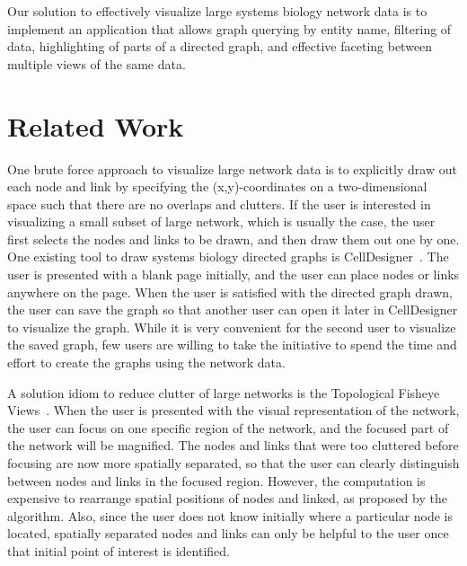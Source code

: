 \documentclass[journal]{vgtc}                %
\begin{document}
Our solution to effectively visualize large systems biology network data is to implement an application that allows graph querying by entity name, filtering of data, highlighting of parts of a directed graph, and effective faceting between multiple views of the same data.





\section{Related Work}
One brute force approach to visualize large network data is to explicitly draw out each node and link by specifying the (x,y)-coordinates on a two-dimensional space such that there are no overlaps and clutters. If the user is interested in visualizing a small subset of large network, which is usually the case, the user first selects the nodes and links to be drawn, and then draw them out one by one. One existing tool to draw systems biology directed graphs is CellDesigner~\cite{funahashi2006celldesigner}. The user is presented with a blank page initially, and the user can place nodes or links anywhere on the page. When the user is satisfied with the  directed graph drawn, the user can save the graph so that another user can open it later in CellDesigner to visualize the graph. While it is very convenient for the second user to visualize the saved graph, few users are willing to take the initiative to spend the time and effort to create the graphs using the network data. 

A solution idiom to reduce clutter of large networks is the Topological Fisheye Views~\cite{gansner2005topological}. When the user is presented with the visual representation of the network, the user can focus on one specific region of the network, and the focused part of the network will be magnified. The nodes and links that were too cluttered before focusing are now more spatially separated, so that the user can clearly distinguish between nodes and links in the focused region. However, the computation is expensive to rearrange spatial positions of nodes and linked, as proposed by the algorithm. Also, since the user does not know initially where a particular node is located, spatially separated nodes and links can only be helpful to the user once that initial point of interest is identified. 
\end{document}
